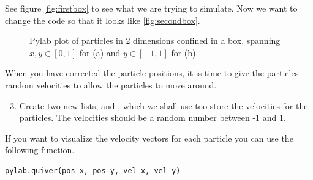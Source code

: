 \documentclass{article}
\begin{document}
See figure \ref{fig:firstbox} to see what we are trying to simulate.
Now we want to change the code so that it looks like \ref{fig:secondbox}.

\begin{figure}[htb]
  \centering
  \caption{
    Pylab plot of particles in 2 dimensions confined in a box,
    spanning $x, y \in [0,1]$ for (a) and $y \in [-1,1]$ for (b).
  }
\end{figure}


\newpage

When you have corrected the particle positions, it is time to give the
particles random velocities to allow the particles to move around.

\begin{enumerate}
  \setcounter{enumi}{2}
  \item Create
    two new lists,  and , which we shall use too
    store the velocities for the particles.
    The velocities should be a random number between -1 and 1.
\end{enumerate}

If you want to visualize the velocity vectors for each particle you can
use the following function.\\

\begin{lstlisting}
pylab.quiver(pos_x, pos_y, vel_x, vel_y)
\end{lstlisting}
\end{document}
